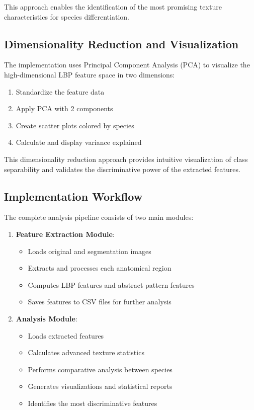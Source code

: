 \documentclass[a4paper,12pt]{report}
\begin{document}
This approach enables the identification of the most promising texture characteristics for species differentiation.

\subsection{Dimensionality Reduction and Visualization}

The implementation uses Principal Component Analysis (PCA) to visualize the high-dimensional LBP feature space in two dimensions:

\begin{enumerate}
    \item Standardize the feature data
    \item Apply PCA with 2 components
    \item Create scatter plots colored by species
    \item Calculate and display variance explained
\end{enumerate}

This dimensionality reduction approach provides intuitive visualization of class separability and validates the discriminative power of the extracted features.

\subsection{Implementation Workflow}

The complete analysis pipeline consists of two main modules:

\begin{enumerate}
    \item \textbf{Feature Extraction Module}:
    \begin{itemize}
        \item Loads original and segmentation images
        \item Extracts and processes each anatomical region
        \item Computes LBP features and abstract pattern features
        \item Saves features to CSV files for further analysis
    \end{itemize}

    \item \textbf{Analysis Module}:
    \begin{itemize}
        \item Loads extracted features
        \item Calculates advanced texture statistics
        \item Performs comparative analysis between species
        \item Generates visualizations and statistical reports
        \item Identifies the most discriminative features
    \end{itemize}
\end{enumerate}
\end{document}
